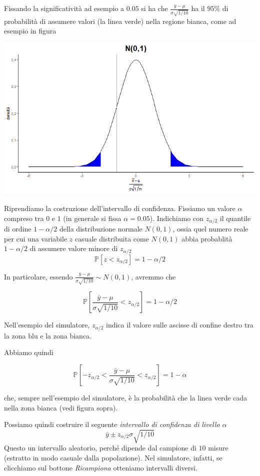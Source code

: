 \documentclass[
  11pt,
]{book}
\begin{document}
Fissando la significatività ad esempio a \(0.05\) si ha che \(\frac{\bar{y}-\mu}{\sigma\sqrt{1/10}}\) ha il \(95\)\% di probabilità di assumere valori (la linea verde) nella regione bianca, come ad esempio in figura

\begin{center}\includegraphics[width=0.5\linewidth]{Immagini/Inferenziale/simulazione_media4} \end{center}

Riprendiamo la costruzione dell'intervallo di confidenza. Fissiamo un valore \(\alpha\) compreso tra \(0\) e \(1\) (in generale si fissa \(\alpha=0.05\)). Indichiamo con \(z_{\alpha/2}\) il quantile di ordine \(1-\alpha/2\) della distribuzione normale \(N(0,1)\), ossia quel numero reale per cui una variabile \(z\) casuale distribuita come \(N(0,1)\) abbia probablità \(1-\alpha/2\) di assumere valore minore di \(z_{\alpha/2}\)
\[
\mathbb{P}[z < z_{\alpha/2}] = 1-\alpha/2
\]

In particolare, essendo \(\frac{\bar{y}-\mu}{\sigma\sqrt{1/10}} \sim N(0,1)\), avremmo che

\[
\mathbb{P}[\frac{\bar{y}-\mu}{\sigma\sqrt{1/10}} < z_{\alpha/2}] = 1-\alpha/2
\]

Nell'esempio del simulatore, \(z_{\alpha/2}\) indica il valore sulle ascisse di confine destro tra la zona blu e la zona bianca.

Abbiamo quindi

\[
\mathbb{P}[- z_{\alpha/2}<\frac{\bar{y}-\mu}{\sigma\sqrt{1/10}} < z_{\alpha/2}] = 1-\alpha
\]

che, sempre nell'esempio del simulatore, è la probabilità che la linea verde cada nella zona bianca (vedi figura sopra).

Possiamo quindi costruire il seguente \emph{intervallo di confidenza di livello \(\alpha\)}
\[
\bar{y} \pm z_{\alpha/2} \sigma \sqrt{1/10}
\]
Questo un intervallo aleatorio, perché dipende dal campione di \(10\) misure (estratto in modo casuale dalla popolazione). Nel simulatore, infatti, se clicchiamo sul bottone \emph{Ricampiona} otteniamo intervalli diversi.
\end{document}
